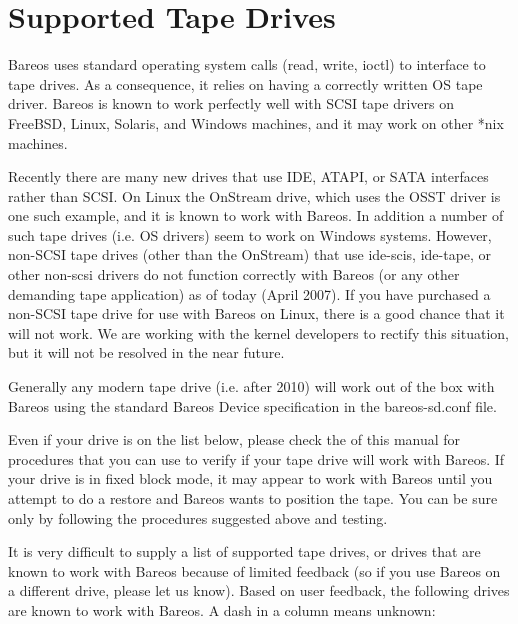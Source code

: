 
\chapter{Supported Tape Drives}
\label{SupportedDrives}

Bareos uses standard operating system calls (read, write, ioctl) to
interface to tape drives.  As a consequence, it relies on having a
correctly written OS tape driver. Bareos is known to work perfectly well
with SCSI tape drivers on FreeBSD, Linux, Solaris, and Windows machines,
and it may work on other *nix machines.

Recently there are many new drives that use IDE, ATAPI, or
SATA interfaces rather than SCSI. On Linux the OnStream drive, which uses
the OSST driver is one such
example, and it is known to work with Bareos. In addition a number of such
tape drives (i.e. OS drivers) seem to work on Windows systems.  However,
non-SCSI tape drives (other than the OnStream) that use ide-scis, ide-tape,
or other non-scsi drivers do not function correctly with Bareos (or any
other demanding tape application) as of today (April 2007).  If you
have purchased a non-SCSI tape drive for use with Bareos on Linux, there
is a good chance that it will not work. We are working with the kernel
developers to rectify this situation, but it will not be resolved in the
near future.

Generally any modern tape drive (i.e. after 2010) will work out
of the box with Bareos using the standard Bareos Device specification
in the bareos-sd.conf file.

Even if your drive is on the list below, please check the
 of this manual for
procedures that you can use to verify if your tape drive will work with
Bareos. If your drive is in fixed block mode, it may appear to work with
Bareos until you attempt to do a restore and Bareos wants to position the
tape. You can be sure only by following the procedures suggested above and
testing.

It is very difficult to supply a list of supported tape drives, or drives that
are known to work with Bareos because of limited feedback (so if you use
Bareos on a different drive, please let us know). Based on user feedback, the
following drives are known to work with Bareos. A dash in a column means
unknown:

